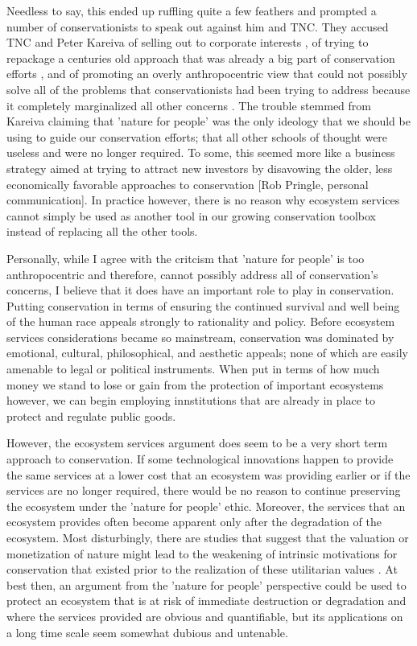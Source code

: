 \documentclass[rutwik_proposal.tex]{subfiles}
\begin{document}
Needless to say, this ended up ruffling quite a few feathers and prompted a number of conservationists to speak out against him and TNC. They accused TNC and Peter Kareiva of selling out to corporate interests \cite{Soule14}, of trying to repackage a centuries old approach that was already a big part of conservation efforts \cite{Greenwald13, Doak14}, and of promoting an overly anthropocentric view that could not possibly solve all of the problems that conservationists had been trying to address because it completely marginalized all other concerns \cite{Doak14}. The trouble stemmed from Kareiva claiming that 'nature for people' was the only ideology that we should be using to guide our conservation efforts; that all other schools of thought were useless and were no longer required. To some, this seemed more like a business strategy aimed at trying to attract new investors by disavowing the older, less economically favorable approaches to conservation [Rob Pringle, personal communication]. In practice however, there is no reason why ecosystem services cannot simply be used as another tool in our growing conservation toolbox instead of replacing all the other tools.

Personally, while I agree with the critcism that 'nature for people' is too anthropocentric and therefore, cannot possibly address all of conservation's concerns, I believe that it does have an important role to play in conservation. Putting conservation in terms of ensuring the continued survival and well being of the human race appeals strongly to rationality and policy. Before ecosystem services considerations became so mainstream, conservation was dominated by emotional, cultural, philosophical, and aesthetic appeals; none of which are easily amenable to legal or political instruments. When put in terms of how much money we stand to lose or gain from the protection of important ecosystems however, we can begin employing innstitutions that are already in place to protect and regulate public goods.

However, the ecosystem services argument does seem to be a very short term approach to conservation. If some technological innovations happen to provide the same services at a lower cost that an ecosystem was providing earlier or if the services are no longer required, there would be no reason to continue preserving the ecosystem under the 'nature for people' ethic. Moreover, the services that an ecosystem provides often become apparent only after the degradation of the ecosystem. Most disturbingly, there are studies that suggest that the valuation or monetization of nature might lead to the weakening of intrinsic motivations for conservation that existed prior to the realization of these utilitarian values \cite{Agrawal15}. At best then, an argument from the 'nature for people' perspective could be used to protect an ecosystem that is at risk of immediate destruction or degradation and where the services provided are obvious and quantifiable, but its applications on a long time scale seem somewhat dubious and untenable.
\end{document}
